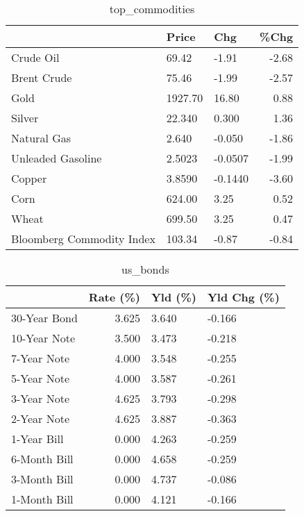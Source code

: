 \documentclass{article}%
\begin{document}
\begin{table}[htbp]%
\caption{top\_commodities}%
\centering%
\begin{adjustbox}{width=1\textwidth}%
\begin{tabular}{lllr}
\toprule
                          &   Price &     Chg &  \%Chg \\
\midrule
               Crude Oil  &   69.42 &   -1.91 & -2.68 \\
             Brent Crude  &   75.46 &   -1.99 & -2.57 \\
                    Gold  & 1927.70 &   16.80 &  0.88 \\
                  Silver  &  22.340 &   0.300 &  1.36 \\
             Natural Gas  &   2.640 &  -0.050 & -1.86 \\
       Unleaded Gasoline  &  2.5023 & -0.0507 & -1.99 \\
                  Copper  &  3.8590 & -0.1440 & -3.60 \\
                    Corn  &  624.00 &    3.25 &  0.52 \\
                   Wheat  &  699.50 &    3.25 &  0.47 \\
Bloomberg Commodity Index &  103.34 &   -0.87 & -0.84 \\
\bottomrule
\end{tabular}
%
\end{adjustbox}%
\end{table}

%


\begin{table}[htbp]%
\caption{us\_bonds}%
\centering%
\begin{adjustbox}{width=1\textwidth}%
\begin{tabular}{lrll}
\toprule
             &  Rate (\%) & Yld (\%) & Yld Chg (\%) \\
\midrule
30-Year Bond &     3.625 &   3.640 &      -0.166 \\
10-Year Note &     3.500 &   3.473 &      -0.218 \\
 7-Year Note &     4.000 &   3.548 &      -0.255 \\
 5-Year Note &     4.000 &   3.587 &      -0.261 \\
 3-Year Note &     4.625 &   3.793 &      -0.298 \\
 2-Year Note &     4.625 &   3.887 &      -0.363 \\
 1-Year Bill &     0.000 &   4.263 &      -0.259 \\
6-Month Bill &     0.000 &   4.658 &      -0.259 \\
3-Month Bill &     0.000 &   4.737 &      -0.086 \\
1-Month Bill &     0.000 &   4.121 &      -0.166 \\
\bottomrule
\end{tabular}
%
\end{adjustbox}%
\end{table}
\end{document}
